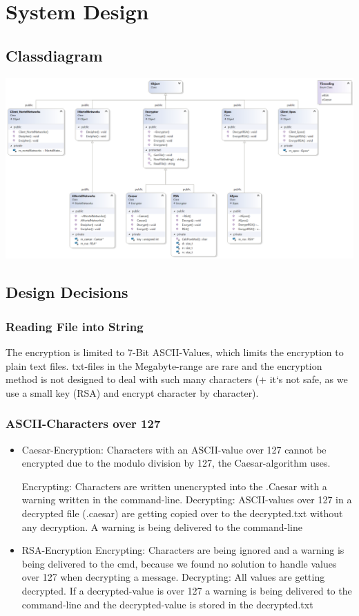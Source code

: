 \section{System Design}
\subsection{Classdiagram}
\includegraphics[scale=0.56, angle=90]{ClassDiagram}

\subsection{Design Decisions}
\subsubsection{Reading File into String}
The encryption is limited to 7-Bit ASCII-Values, which limits the encryption to plain text files. txt-files in the Megabyte-range are rare and the encryption method is not designed to deal with such many characters (+ it`s not safe, as we use a small key (RSA) and encrypt character by character).
\subsubsection{ASCII-Characters over 127}
\begin{itemize}
	\item Caesar-Encryption:	Characters with an ASCII-value over 127 cannot be encrypted due to the modulo division by 127, the Caesar-algorithm uses.	
	
	\subitem Encrypting: Characters are written unencrypted into the .Caesar with a warning written 
	\subitem in the command-line. 
	\subitem Decrypting: ASCII-values over 127 in a decrypted file (.caesar) are getting copied over to the decrypted.txt without any decryption. 
			A warning is being delivered to the command-line

	\item RSA-Encryption
	\subitem Encrypting: Characters are being ignored and a warning is being delivered to the cmd, because we found no solution 
		to handle values over 127 when decrypting a message. 
	\subitem Decrypting: All values are getting decrypted. If a decrypted-value is over 127 a warning is being delivered to 
		the command-line and the decrypted-value is stored in the decrypted.txt

\end{itemize}

